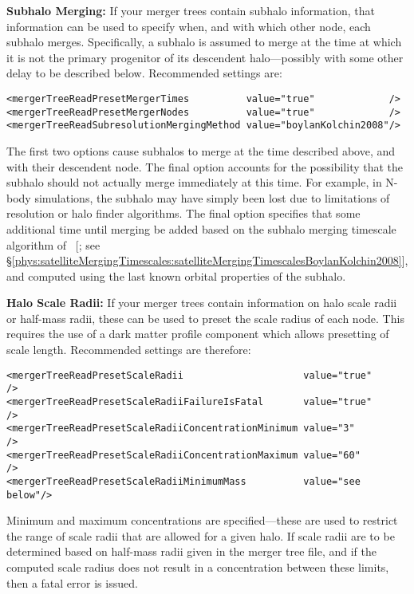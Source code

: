 {\normalfont \bfseries Subhalo Merging:} If your merger trees contain subhalo information, that information can be used to specify when, and with which other node, each subhalo merges. Specifically, a subhalo is assumed to merge at the time at which it is not the primary progenitor of its descendent halo---possibly with some other delay to be described below. Recommended settings are:
\begin{verbatim}
<mergerTreeReadPresetMergerTimes          value="true"             />
<mergerTreeReadPresetMergerNodes          value="true"             />
<mergerTreeReadSubresolutionMergingMethod value="boylanKolchin2008"/>
\end{verbatim}
The first two options cause subhalos to merge at the time described above, and with their descendent node. The final option accounts for the possibility that the subhalo should not actually merge immediately at this time. For example, in N-body simulations, the subhalo may have simply been lost due to limitations of resolution or halo finder algorithms. The final option specifies that some additional time until merging be added based on the subhalo merging timescale algorithm of \citeauthor{boylan-kolchin_dynamical_2008}~[\citeyear{boylan-kolchin_dynamical_2008}; see \S\ref{phys:satelliteMergingTimescales:satelliteMergingTimescalesBoylanKolchin2008}], and computed using the last known orbital properties of the subhalo.

{\normalfont \bfseries Halo Scale Radii:} If your merger trees contain information on halo scale radii or half-mass radii, these can be used to preset the scale radius of each \gls{node}. This requires the use of a dark matter profile component which allows presetting of scale length. Recommended settings are therefore:
\begin{verbatim}
<mergerTreeReadPresetScaleRadii                     value="true"     />
<mergerTreeReadPresetScaleRadiiFailureIsFatal       value="true"     />
<mergerTreeReadPresetScaleRadiiConcentrationMinimum value="3"        />
<mergerTreeReadPresetScaleRadiiConcentrationMaximum value="60"       />
<mergerTreeReadPresetScaleRadiiMinimumMass          value="see below"/>
\end{verbatim}
Minimum and maximum concentrations are specified---these are used to restrict the range of scale radii that are allowed for a given halo. If scale radii are to be determined based on half-mass radii given in the merger tree file, and if the computed scale radius does not result in a concentration between these limits, then a fatal error is issued.

